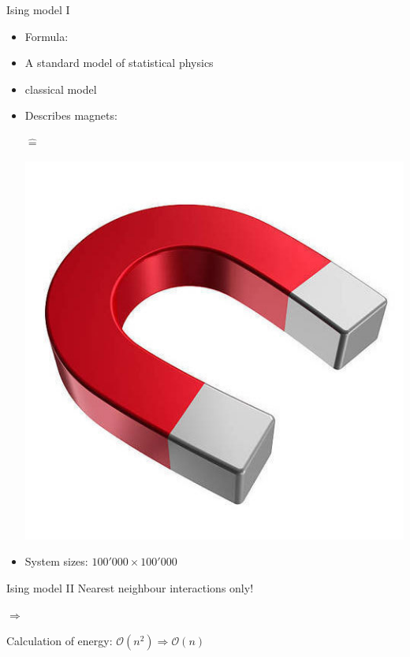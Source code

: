 \documentclass{beamer}
\begin{document}
\begin{frame}{Ising model I}
\begin{itemize}
    \item Formula:
        \ising \pause
    \item A standard model of statistical physics \pause
    \item classical model \pause
    \item Describes magnets:\\
        \begin{minipage}{0.3\textwidth}\end{minipage}
        \hspace{1.2cm}
        \begin{minipage}{0.2\textwidth} \Huge \textbf{$\mathrel{\widehat{=}}$} \end{minipage}
        \begin{minipage}{0.2\textwidth}\includegraphics[keepaspectratio=true, width=0.3\paperwidth]{images/magnet.jpg}\end{minipage} \pause
    \item System sizes: $100'000 \times 100'000$
\end{itemize}
\end{frame}

\begin{frame}{Ising model II}
    Nearest neighbour interactions only!
    \ising \pause
    \vspace{1cm}
    \begin{minipage}{0.3\paperwidth}\end{minipage}
    {\Huge$\Rightarrow$}
    \begin{minipage}{0.2\paperwidth}\end{minipage} \pause
    
    Calculation of energy: $\mathcal{O}\left( n^2 \right) \Rightarrow \mathcal{O}\left( n \right)$
\end{frame}
\end{document}
